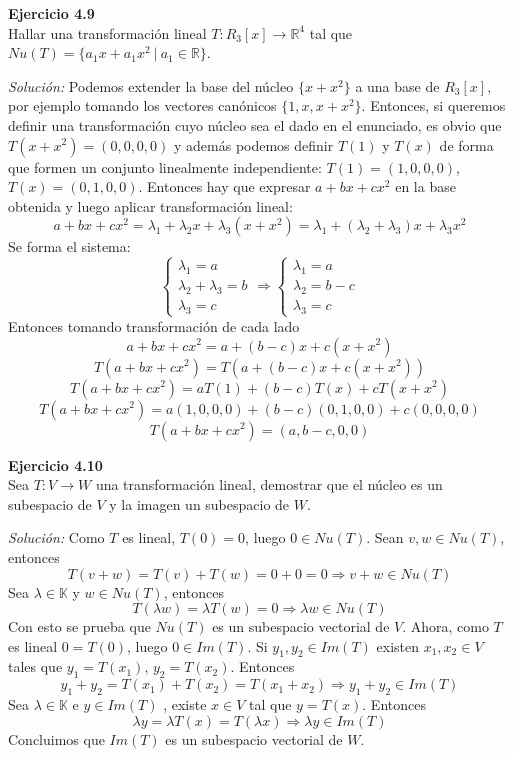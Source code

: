 \documentclass{article}
\newenvironment{problem}[2][Ejercicio]
    { \begin{mdframed}[backgroundcolor=gray!20] \textbf{#1 #2} \\}
    {  \end{mdframed}}
\newenvironment{solution}
    {\textit{Solución:}}
    {}
\begin{document}
\begin{problem}{4.9}
    Hallar una transformación lineal $T : R_3[x] \to \mathbb{R}^4$ tal que $Nu(T) = \{ a_1x + a_1x^2 \ | \ a_1 \in \mathbb{R} \}$.
\end{problem}
\begin{solution}
    Podemos extender la base del núcleo $\{x+x^2 \}$ a una base de $R_3[x]$, por ejemplo tomando los vectores canónicos $\{1,x,x+x^2\}$. Entonces, si queremos definir una transformación cuyo núcleo sea el dado en el enunciado, es obvio que $T(x+x^2)=(0,0,0,0)$ y además podemos definir $T(1)$ y $T(x)$ de forma que formen un conjunto linealmente independiente: $T(1) = (1,0,0,0)$, $T(x)=(0,1,0,0)$.
Entonces hay que expresar $a+bx+cx^2$ en la base obtenida y luego aplicar transformación lineal:
\[
a+bx+cx^2 = \lambda_1 + \lambda_2 x + \lambda_3 (x+x^2) = \lambda_1+(\lambda_2+\lambda_3)x+\lambda_3x^2
\]
Se forma el sistema:
\[
\begin{cases}
\lambda_1 = a \\
\lambda_2+\lambda_3 = b \\
\lambda_3 = c
\end{cases} \Rightarrow
\begin{cases}
\lambda_1 = a \\
\lambda_2 = b-c \\
\lambda_3 = c
\end{cases}
\]
Entonces tomando transformación de cada lado
\[
a+bx+cx^2 = a + (b-c)x + c (x+x^2)
\]\[
T(a+bx+cx^2) = T(a + (b-c)x + c (x+x^2))
\]\[
T(a+bx+cx^2) = aT(1) + (b-c)T(x) + c T(x+x^2)
\]\[
T(a+bx+cx^2) = a(1,0,0,0) + (b-c)(0,1,0,0) + c(0,0,0,0)
\]\[
T(a+bx+cx^2) = (a,b-c,0,0)
\]
\end{solution}

\begin{problem}{4.10}
    Sea $T:V\to W$ una transformación lineal, demostrar que el núcleo es un subespacio de $V$ y la imagen un subespacio de $W$.
\end{problem}
\begin{solution}
    Como $T$ es lineal, $T(0)=0$, luego $0\in Nu(T)$. Sean $v,w \in Nu(T)$, entonces
\[
T(v+w) = T(v)+T(w) = 0+0 = 0 \Rightarrow v+w \in Nu(T)
\]
Sea $\lambda \in \mathbb{K}$ y $w \in Nu(T)$, entonces
\[
T(\lambda w) = \lambda T(w) = 0 \Rightarrow \lambda w \in Nu(T)
\]
Con esto se prueba que $Nu(T)$ es un subespacio vectorial de $V$.
Ahora, como $T$ es lineal $0=T(0)$, luego $0\in Im(T)$. Si $y_1,y_2 \in Im(T)$ existen $x_1,x_2 \in V$ tales que $y_1=T(x_1)$, $y_2=T(x_2)$. Entonces
\[
y_1+y_2 = T(x_1)+T(x_2) = T(x_1+x_2) \Rightarrow y_1+y_2\in Im(T)
\]
Sea $\lambda \in \mathbb{K}$ e $y \in Im(T)$ , existe $x\in V$ tal que $y=T(x)$. Entonces
\[
\lambda y = \lambda T(x) = T(\lambda x) \Rightarrow \lambda y \in Im(T)
\]
Concluimos que $Im(T)$ es un subespacio vectorial de $W$.
\end{solution}

\end{document}
